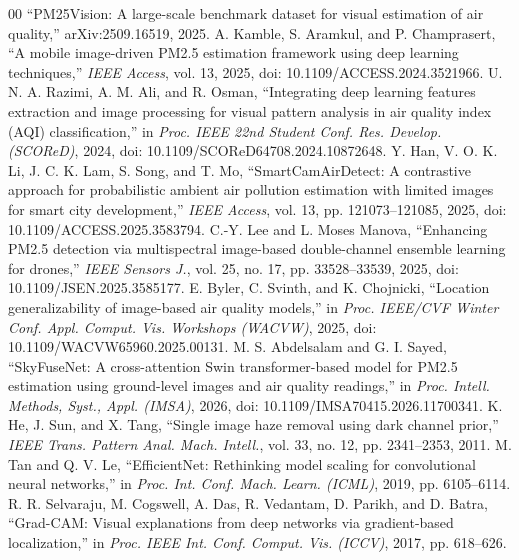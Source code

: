 \documentclass[conference]{IEEEtran}
\begin{document}
\begin{thebibliography}{00}
 ``PM25Vision: A large-scale benchmark dataset for visual estimation of air quality,'' arXiv:2509.16519, 2025.
 A. Kamble, S. Aramkul, and P. Champrasert, ``A mobile image-driven PM2.5 estimation framework using deep learning techniques,'' \textit{IEEE Access}, vol. 13, 2025, doi: 10.1109/ACCESS.2024.3521966.
 U. N. A. Razimi, A. M. Ali, and R. Osman, ``Integrating deep learning features extraction and image processing for visual pattern analysis in air quality index (AQI) classification,'' in \textit{Proc. IEEE 22nd Student Conf. Res. Develop. (SCOReD)}, 2024, doi: 10.1109/SCOReD64708.2024.10872648.
 Y. Han, V. O. K. Li, J. C. K. Lam, S. Song, and T. Mo, ``SmartCamAirDetect: A contrastive approach for probabilistic ambient air pollution estimation with limited images for smart city development,'' \textit{IEEE Access}, vol. 13, pp. 121073--121085, 2025, doi: 10.1109/ACCESS.2025.3583794.
 C.-Y. Lee and L. Moses Manova, ``Enhancing PM2.5 detection via multispectral image-based double-channel ensemble learning for drones,'' \textit{IEEE Sensors J.}, vol. 25, no. 17, pp. 33528--33539, 2025, doi: 10.1109/JSEN.2025.3585177.
 E. Byler, C. Svinth, and K. Chojnicki, ``Location generalizability of image-based air quality models,'' in \textit{Proc. IEEE/CVF Winter Conf. Appl. Comput. Vis. Workshops (WACVW)}, 2025, doi: 10.1109/WACVW65960.2025.00131.
 M. S. Abdelsalam and G. I. Sayed, ``SkyFuseNet: A cross-attention Swin transformer-based model for PM2.5 estimation using ground-level images and air quality readings,'' in \textit{Proc. Intell. Methods, Syst., Appl. (IMSA)}, 2026, doi: 10.1109/IMSA70415.2026.11700341.
 K. He, J. Sun, and X. Tang, ``Single image haze removal using dark channel prior,'' \textit{IEEE Trans. Pattern Anal. Mach. Intell.}, vol. 33, no. 12, pp. 2341--2353, 2011.
 M. Tan and Q. V. Le, ``EfficientNet: Rethinking model scaling for convolutional neural networks,'' in \textit{Proc. Int. Conf. Mach. Learn. (ICML)}, 2019, pp. 6105--6114.
 R. R. Selvaraju, M. Cogswell, A. Das, R. Vedantam, D. Parikh, and D. Batra, ``Grad-CAM: Visual explanations from deep networks via gradient-based localization,'' in \textit{Proc. IEEE Int. Conf. Comput. Vis. (ICCV)}, 2017, pp. 618--626.

\end{thebibliography}
\end{document}
